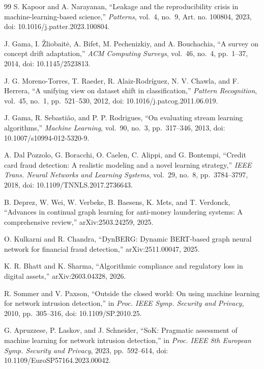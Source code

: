 \documentclass[conference]{IEEEtran}
\begin{document}
\begin{thebibliography}{99}
 S. Kapoor and A. Narayanan, ``Leakage and the reproducibility crisis in machine-learning-based science,'' \emph{Patterns}, vol.~4, no.~9, Art. no. 100804, 2023, doi: 10.1016/j.patter.2023.100804.

 J. Gama, I. \v{Z}liobait\.e, A. Bifet, M. Pechenizkiy, and A. Bouchachia, ``A survey on concept drift adaptation,'' \emph{ACM Computing Surveys}, vol.~46, no.~4, pp.~1--37, 2014, doi: 10.1145/2523813.

 J. G. Moreno-Torres, T. Raeder, R. Alaiz-Rodr\'iguez, N. V. Chawla, and F. Herrera, ``A unifying view on dataset shift in classification,'' \emph{Pattern Recognition}, vol.~45, no.~1, pp.~521--530, 2012, doi: 10.1016/j.patcog.2011.06.019.

 J. Gama, R. Sebasti\~ao, and P. P. Rodrigues, ``On evaluating stream learning algorithms,'' \emph{Machine Learning}, vol.~90, no.~3, pp.~317--346, 2013, doi: 10.1007/s10994-012-5320-9.

 A. Dal Pozzolo, G. Boracchi, O. Caelen, C. Alippi, and G. Bontempi, ``Credit card fraud detection: A realistic modeling and a novel learning strategy,'' \emph{IEEE Trans. Neural Networks and Learning Systems}, vol.~29, no.~8, pp.~3784--3797, 2018, doi: 10.1109/TNNLS.2017.2736643.

 B. Deprez, W. Wei, W. Verbeke, B. Baesens, K. Mets, and T. Verdonck, ``Advances in continual graph learning for anti-money laundering systems: A comprehensive review,'' arXiv:2503.24259, 2025.

 O. Kulkarni and R. Chandra, ``DynBERG: Dynamic BERT-based graph neural network for financial fraud detection,'' arXiv:2511.00047, 2025.

 K. R. Bhatt and K. Sharma, ``Algorithmic compliance and regulatory loss in digital assets,'' arXiv:2603.04328, 2026.

 R. Sommer and V. Paxson, ``Outside the closed world: On using machine learning for network intrusion detection,'' in \emph{Proc. IEEE Symp. Security and Privacy}, 2010, pp.~305--316, doi: 10.1109/SP.2010.25.

 G. Apruzzese, P. Laskov, and J. Schneider, ``SoK: Pragmatic assessment of machine learning for network intrusion detection,'' in \emph{Proc. IEEE 8th European Symp. Security and Privacy}, 2023, pp.~592--614, doi: 10.1109/EuroSP57164.2023.00042.


\end{thebibliography}
\end{document}
